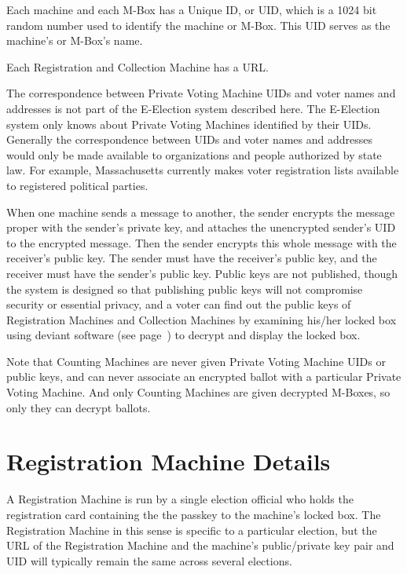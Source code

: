\documentclass[12pt]{article}
\newcommand{\pagref}[1]{(see page~\pageref{#1})}
\begin{document}
Each machine and each M-Box
has a Unique ID, or UID, which is a 1024 bit random number
used to identify the machine or M-Box.  This UID serves as the
machine's or M-Box's name.

Each Registration and Collection Machine has a URL.

The correspondence between Private Voting Machine UIDs
and voter names and addresses is not part of the E-Election system
described here.  The E-Election system only knows about
Private Voting Machines identified by their UIDs.
Generally the correspondence between UIDs and voter names and addresses
would only be made available
to organizations and people authorized by state law.
For example, Massachusetts currently makes voter registration lists
available to registered political parties.

When one machine sends a message to another, the sender
encrypts the message proper with the sender's private
key, and attaches the unencrypted sender's UID to the
encrypted message.  Then the sender encrypts this whole message with the
receiver's public key.  The sender must have the receiver's
public key, and the receiver must have the sender's public
key.  Public keys are not published,
though the system is designed so that publishing public
keys will not compromise security or essential privacy,
and a voter can find out the public keys of Registration
Machines and Collection Machines by examining his/her locked
box using deviant software \pagref{DEVIANT-SOFTWARE} to decrypt and
display the locked box.

Note that Counting Machines are never given Private Voting
Machine UIDs or public keys, and can never associate an
encrypted ballot with a particular Private Voting Machine.
And only Counting Machines are given decrypted M-Boxes, so
only they can decrypt ballots.

\section{Registration Machine Details}

A Registration Machine is run by a single election official
who holds the registration card containing the the passkey to
the machine's locked box.  The Registration Machine in this
sense is specific to a particular election, but the
URL of the Registration Machine and the machine's
public/private key pair and UID will typically remain the same across
several elections.
\end{document}
